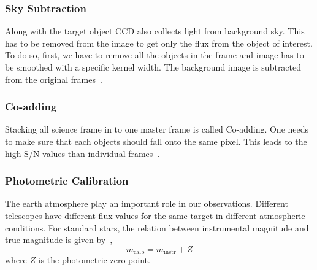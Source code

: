 \subsubsection{Sky Subtraction}
Along with the target object CCD also collects light from background sky. This has to be removed from the image to get only the flux from the object of interest. To do so, first, we have to remove all the objects in the frame and image has to be smoothed with a specific kernel width. The background image is subtracted from the original frames~\cite{manual}.
\subsubsection{Co-adding}
Stacking all science frame in to one master frame is called Co-adding. One needs to make sure that each objects should fall onto the same pixel. This leads to the high S/N values than individual frames~\cite{manual}.
\subsubsection{Photometric Calibration}
The earth atmosphere play an important role in our observations. Different telescopes have different flux values for the same target in different atmospheric conditions. For standard stars, the relation between instrumental magnitude and true magnitude is given by~\cite{manual},
\begin{equation}
{m}_{\text{calb}}={m}_{\text{instr}}+ {Z}
\end{equation}
where $Z$ is the photometric zero point.
